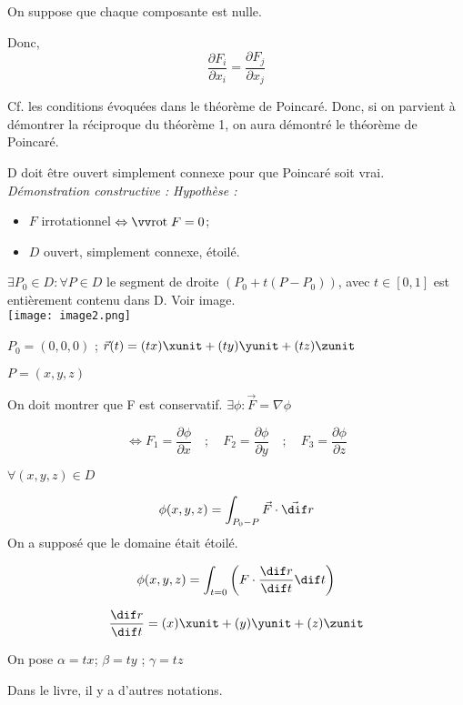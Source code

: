  On suppose que chaque composante est nulle.

 Donc,
 \[\frac{\partial F_i}{\partial x_i}=\frac{\partial F_j}{\partial x_j}\]


Cf. les conditions évoquées dans le théorème de Poincaré. Donc, si on parvient à démontrer la réciproque du théorème 1, on aura démontré le théorème de Poincaré.

D doit être ouvert simplement connexe pour que Poincaré soit vrai.\\




\textit{
Démonstration constructive :}
\textit{
Hypothèse :}

\begin{itemize}
\item $F$ irrotationnel $\Leftrightarrow \rot F =0$;
\item $D$ ouvert, simplement connexe, étoilé.
\end{itemize}

\begin{mydef}

$\exists P_0 \in D : \forall P \in D $ le segment de droite $(P_0+t( P-P_0))$, avec $t\in [0,1]$ est entièrement contenu dans D. Voir image.\\

\texttt{[image: image2.png]}\\
\end{mydef}

$P_0 = (0,0,0)$ ; $\vec r(t) = (tx)\xunit + (ty) \yunit +(tz) \zunit$

$P=(x,y,z)$

On doit montrer que F est conservatif. $\exists \phi : \vec F = \nabla \phi $

\[\Leftrightarrow F_1=\frac{\partial \phi}{\partial x}\quad;\quad F_2=\frac{\partial \phi}{\partial y}\quad;\quad F_3=\frac{\partial \phi}{\partial z}\]

$\forall(x,y,z)\in D$

\[\phi(x,y,z) = \int_{P_0-P} \vec F \cdot \vec \dif r \] On a supposé que le domaine était étoilé.

\[\phi(x,y,z) = \int _{t=0} \left( F\cdot \frac{\dif r}{\dif t} \dif t \right) \]

\[\frac{\dif r}{\dif t} = (x) \xunit +(y)\yunit +(z) \zunit\]

On pose $\alpha = tx$; $\beta = ty $ ; $\gamma = tz$

Dans le livre, il y a d'autres notations.

